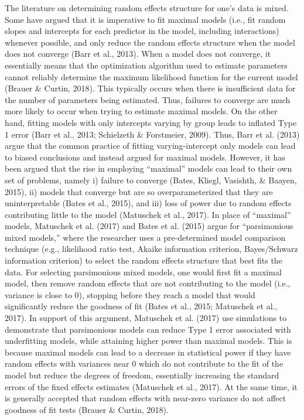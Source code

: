\documentclass[
  english,
  man]{apa6}
\begin{document}
The literature on determining random effects structure for one's data is mixed. Some have argued that it is imperative to fit maximal models (i.e., fit random slopes and intercepts for each predictor in the model, including interactions) whenever possible, and only reduce the random effects structure when the model does not converge (Barr et al., 2013). When a model does not converge, it essentially means that the optimization algorithm used to estimate parameters cannot reliably determine the maximum likelihood function for the current model (Brauer \& Curtin, 2018). This typically occurs when there is insufficient data for the number of parameters being estimated. Thus, failures to converge are much more likely to occur when trying to estimate maximal models. On the other hand, fitting models with only intercepts varying by group leads to inflated Type 1 error (Barr et al., 2013; Schielzeth \& Forstmeier, 2009). Thus, Barr et al. (2013) argue that the common practice of fitting varying-intercept only models can lead to biased conclusions and instead argued for maximal models. However, it has been argued that the rise in employing \enquote{maximal} models can lead to their own set of problems, namely i) failure to converge (Bates, Kliegl, Vasishth, \& Baayen, 2015), ii) models that converge but are so overparameterized that they are uninterpretable (Bates et al., 2015), and iii) loss of power due to random effects contributing little to the model (Matuschek et al., 2017). In place of \enquote{maximal} models, Matuschek et al. (2017) and Bates et al. (2015) argue for \enquote{parsimonious mixed models,} where the researcher uses a pre-determined model comparison technique (e.g., likelihood ratio test, Akaike information criterion, Bayes/Schwarz information criterion) to select the random effects structure that best fits the data. For selecting parsimonious mixed models, one would first fit a maximal model, then remove random effects that are not contributing to the model (i.e., variance is close to 0), stopping before they reach a model that would significantly reduce the goodness of fit (Bates et al., 2015; Matuschek et al., 2017). In support of this argument, Matuschek et al. (2017) use simulations to demonstrate that parsimonious models can reduce Type 1 error associated with underfitting models, while attaining higher power than maximal models. This is because maximal models can lead to a decrease in statistical power if they have random effects with variances near 0 which do not contribute to the fit of the model but reduce the degrees of freedom, essentially increasing the standard errors of the fixed effects estimates (Matuschek et al., 2017). At the same time, it is generally accepted that random effects with near-zero variance do not affect goodness of fit tests (Brauer \& Curtin, 2018).
\end{document}
